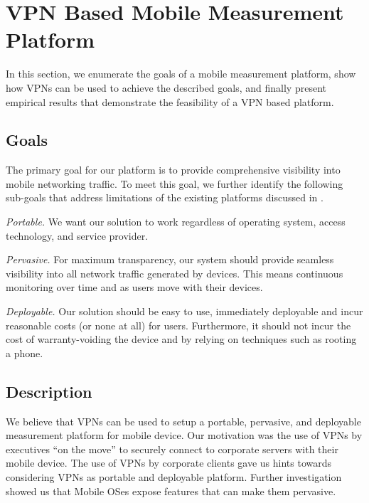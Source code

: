 \section{VPN Based Mobile Measurement Platform} 
\label{sec:platform} 
In this section, we enumerate the goals of a mobile measurement platform,
show how VPNs can be used to achieve the described goals, and finally
present empirical results that demonstrate the feasibility of a VPN based
platform.

\subsection{Goals}  
\label{sec:goals} 
The primary goal for our platform is to provide comprehensive visibility
into mobile networking traffic. To meet this goal, we further identify the
following sub-goals that address limitations of the existing platforms
discussed in .
\begin{packedenumerate}
\item \emph{Portable.} We want our solution to work regardless of
operating system, access technology, and service provider.
\item \emph{Pervasive.} For maximum transparency, our system should
provide seamless visibility into all network traffic generated by devices.
This means continuous monitoring over time and as users move with their
devices.
\item \emph{Deployable.} Our solution should be easy to use, immediately
deployable and incur reasonable costs (or none at all) for users.
Furthermore, it should not incur the cost of warranty-voiding the device
and by relying on techniques such as rooting a phone.
\end{packedenumerate}    

\subsection{Description}
\label{sec:description}

We believe that VPNs can be used to setup a portable, pervasive, and
deployable measurement platform for mobile device. Our motivation was the
use of VPNs by executives ``on the move'' to securely connect to corporate
servers with their mobile device. The use of VPNs by corporate clients gave
us hints towards considering VPNs as portable and deployable platform.
Further investigation showed us that Mobile OSes expose features that can
make them pervasive.  


